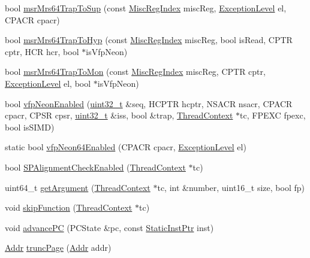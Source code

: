 \begin{DoxyCompactItemize}
\item 
bool \hyperlink{namespaceArmISA_a8039f7e1d2d14bdc65f299fd93a12bf6}{msrMrs64TrapToSup} (const \hyperlink{namespaceArmISA_a1e522017e015d4c7efd6b2360143aa67}{MiscRegIndex} miscReg, \hyperlink{namespaceArmISA_a16588a7a92eb985c3341b7f706c81dd5}{ExceptionLevel} el, CPACR cpacr)
\item 
bool \hyperlink{namespaceArmISA_a912330e390444ce5e1bcee8c62b9fc9d}{msrMrs64TrapToHyp} (const \hyperlink{namespaceArmISA_a1e522017e015d4c7efd6b2360143aa67}{MiscRegIndex} miscReg, bool isRead, CPTR cptr, HCR hcr, bool $\ast$isVfpNeon)
\item 
bool \hyperlink{namespaceArmISA_aba9e8a27eccc4f0111ae5483beaf0297}{msrMrs64TrapToMon} (const \hyperlink{namespaceArmISA_a1e522017e015d4c7efd6b2360143aa67}{MiscRegIndex} miscReg, CPTR cptr, \hyperlink{namespaceArmISA_a16588a7a92eb985c3341b7f706c81dd5}{ExceptionLevel} el, bool $\ast$isVfpNeon)
\item 
bool \hyperlink{namespaceArmISA_a7e57d41caa81aa79fcc9a57f8d74d771}{vfpNeonEnabled} (\hyperlink{Type_8hh_a435d1572bf3f880d55459d9805097f62}{uint32\_\-t} \&seq, HCPTR hcptr, NSACR nsacr, CPACR cpacr, CPSR cpsr, \hyperlink{Type_8hh_a435d1572bf3f880d55459d9805097f62}{uint32\_\-t} \&iss, bool \&trap, \hyperlink{classThreadContext}{ThreadContext} $\ast$tc, FPEXC fpexc, bool isSIMD)
\item 
static bool \hyperlink{namespaceArmISA_a08b9060b98998cf4cba82dfc3d903858}{vfpNeon64Enabled} (CPACR cpacr, \hyperlink{namespaceArmISA_a16588a7a92eb985c3341b7f706c81dd5}{ExceptionLevel} el)
\item 
bool \hyperlink{namespaceArmISA_a0eb858188b4fe7652daef0b13cc05058}{SPAlignmentCheckEnabled} (\hyperlink{classThreadContext}{ThreadContext} $\ast$tc)
\item 
uint64\_\-t \hyperlink{namespaceArmISA_a3f9560369e934be05b1dd8f23fbd6104}{getArgument} (\hyperlink{classThreadContext}{ThreadContext} $\ast$tc, int \&number, uint16\_\-t size, bool fp)
\item 
void \hyperlink{namespaceArmISA_a2624d7d8bac3eb03de2eb6e83903c208}{skipFunction} (\hyperlink{classThreadContext}{ThreadContext} $\ast$tc)
\item 
void \hyperlink{namespaceArmISA_a3722c24211ffbb60ca28e88f4d9c36e8}{advancePC} (PCState \&pc, const \hyperlink{classRefCountingPtr}{StaticInstPtr} inst)
\item 
\hyperlink{classm5_1_1params_1_1Addr}{Addr} \hyperlink{namespaceArmISA_a7f647c107bba5d0c94443866197611b0}{truncPage} (\hyperlink{classm5_1_1params_1_1Addr}{Addr} addr)

\end{DoxyCompactItemize}
